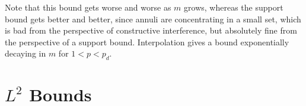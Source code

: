 
Note that this bound gets worse and worse as $m$ grows, whereas the support bound gets better and better, since annuli are concentrating in a small set, which is bad from the perspective of constructive interference, but absolutely fine from the perspective of a support bound. Interpolation gives a bound exponentially decaying in $m$ for $1 < p < p_d$.

\begin{comment}
\begin{proof}[Proof of Lemma \ref{lemma3} from Lemma \ref{lemma6}]
    Write $F = \sum_{(x,r) \in \mathcal{E}_k} \chi_{x,r}$, and then perform a decomposition $\mathcal{E}_k = \bigcup_{m \geq 0} \mathcal{E}_k(2^m)$, and thus define $F = \sum_{m \geq 0} F_m$, where
    \[ F_m = \sum_{(x,r) \in \mathcal{E}(2^m)} \chi_{x,r}. \]
    We have
    \[ \| F_m \|_{L^2(\RR^d)} \lesssim 2^{\frac{m}{d-1} + \frac{k(d-1)}{2}} \log(2 + 2^m)^{1/2} \cdot \#(\mathcal{E}_k)^{1/2}. \]
    If we interpolate this bound with the support bound for $F_m$, a kind of $L^0$ norm estimate, we conclude that for $0 < p \leq 2$,
    \begin{align*}
        \| F_m \|_{L^p(\RR^d)} &\leq |\text{Supp}(F_m)|^{1/p - 1/2} \| F_m \|_{L^2(\RR^d)}\\
        &\lesssim ( 2^{k(d-1) - m})^{1/p - 1/2} 2^{\frac{m}{d-1} + \frac{k(d-1)}{2}} \log(2 + 2^m)^{1/2} \cdot \#(\mathcal{E}_k)^{1/p} \\
        &\lesssim 2^{m(1/p_d - 1/p)} \log(2 + 2^m)^{1/2} 2^{\frac{k(d-1)}{p}} \#(\mathcal{E}_k)^{1/p}.
    \end{align*}
    where $p_d = 2(d-1)/(d+1)$. This bound is summable in $m$ for $p < p_d$, which enables us to conclude that
    \[ \| F \|_{L^p(\RR^d)} \lesssim 2^{\frac{k(d-1)}{p}} \#(\mathcal{E}_k)^{1/p}. \]
    Thus for $1 \leq p < p_d$, we obtain the bound stated in Lemma \ref{lemma3}.
\end{proof}
\end{comment}

\section{$L^2$ Bounds}

